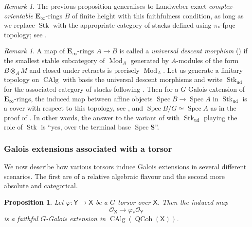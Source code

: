 \documentclass[11pt, a4paper]{article}
\newcommand{\ud}{\mathrm{ud}}
\DeclareMathOperator{\Spec}{Spec}
\newcommand{\1}{\mathbf{1}}
\newcommand{\Sph}{\mathbf{S}}
\DeclareMathOperator{\CAlg}{CAlg}
\DeclareMathOperator{\Mod}{Mod}
\DeclareMathOperator{\QCoh}{QCoh}
\DeclareMathOperator{\Stk}{Stk}
\newcommand{\E}{\mathbf{E}}
\newcommand{\M}{\mathsf{M}}
\renewcommand{\O}{\mathcal{O}}
\newcommand{\X}{\mathsf{X}}
\newcommand{\Y}{\mathsf{Y}}
\theoremstyle{plain}
\newtheorem{prop}[equation]{Proposition}
\theoremstyle{definition}
\theoremstyle{remark}\numberwithin{equation}{section}
\newtheorem{remark}[equation]{Remark}
\begin{document}
\begin{remark}
    The previous proposition generalises to Landweber exact \emph{complex-orientable} $\E_\infty$-rings $B$ of finite height with this faithfulness condition, as long as we replace $\Stk$ with the appropriate category of stacks defined using $\pi_\ast$-fpqc topology; see \cite[Rmk.4.1.2.6]{reconstruction}.
\end{remark}

\begin{remark}\label{rmk:universal_descent_topology}
    A map of $\E_\infty$-rings $A \to B$ is called a \emph{universal descent morphism} (\cite[Df.D.3.1.1]{sag}) if the smallest stable subcategory of $\Mod_A$ generated by $A$-modules of the form $B\otimes_A M$ and closed under retracts is precisely $\Mod_A$. Let us generate a finitary topology on $\CAlg$ with basis the universal descent morphisms and write $\Stk_\ud$ for the associated category of stacks following \cite[Def.2.1.1.5]{reconstruction}. Then for a $G$-Galois extension of $\E_\infty$-rings, the induced map between affine objects $\Spec B \to \Spec A$ in $\Stk_\ud$ is a cover with respect to this topology, see \cite[Lm.9.1.2]{johnrognessdualisinggorups}, and $\Spec B / G \simeq \Spec A$ as in the proof of . In other words, the answer to the variant of  with $\Stk_\ud$ playing the role of $\Stk$ is ``yes, over the terminal base $\Spec \Sph$''.
\end{remark}

\subsubsection{Galois extensions associated with a torsor}\label{ssec:relationtoGalois}
We now describe how various torsors induce Galois extensions in several different scenarios. The first are of a relative algebraic flavour and the second more absolute and categorical.

\begin{prop}\label{pr:torsor_to_Galois_inQCoh}
    Let $\varphi\colon \Y \to \X$ be a $G$-torsor over $\X$. Then the induced map
    \[\O_\X \to \varphi_\ast \O_\Y\]
    is a faithful $G$-Galois extension in $\CAlg(\QCoh(\X))$.%
\end{prop}
\end{document}
